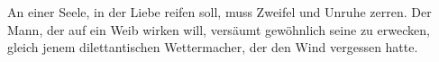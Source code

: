 An einer Seele, in der Liebe reifen soll, muss Zweifel und Unruhe zerren. Der Mann, der auf ein Weib wirken will, versäumt gewöhnlich seine  zu erwecken, gleich jenem dilettantischen Wettermacher, der den Wind vergessen hatte.
\par

